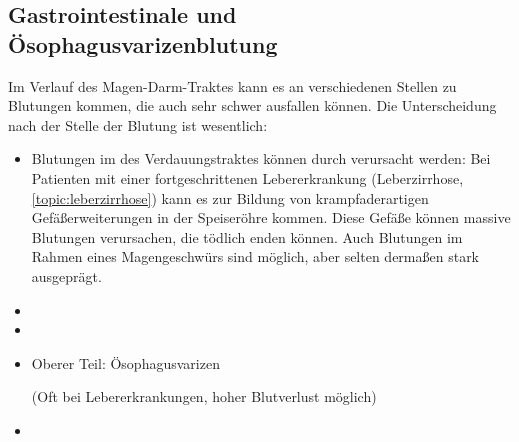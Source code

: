 \subsection{Gastrointestinale
 und Ösophagusvarizenblutung}
\label{topic:oesophagusvarizenblutung}%
\label{topic:gastrointestinale-blutung}%


\TextSlide{\TxBeschreibung}
{%
 Im Verlauf des Magen-Darm-Traktes kann es an verschiedenen
Stellen zu Blutungen kommen, die auch sehr schwer ausfallen
können. Die Unterscheidung nach der Stelle der Blutung ist
wesentlich:
\begin{itemize}
  \item Blutungen im  des Verdauungstraktes können
  durch
  verursacht werden: Bei Patienten
  mit einer fortgeschrittenen Lebererkrankung (Leberzirrhose, 
  \ref{topic:leberzirrhose}) kann es zur Bildung von 
  krampfaderartigen Gefäßerweiterungen in der Speiseröhre
  kommen. Diese Gefäße können massive Blutungen verursachen,
  die tödlich enden können. Auch Blutungen im Rahmen eines
  Magengeschwürs sind möglich, aber selten dermaßen stark
  ausgeprägt.
  \item {}
  \item {}
\end{itemize}




}
{
\begin{itemize}
    \item Oberer Teil: Ösophagusvarizen
    
    (Oft bei
    Lebererkrankungen, hoher Blutverlust möglich)
    \item {}
\end{itemize}
}{}{}{}

